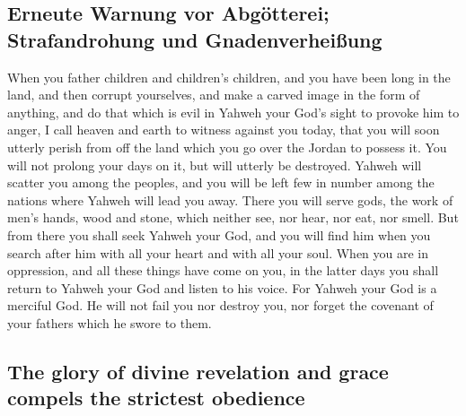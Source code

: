 \hypertarget{erneute-warnung-vor-abguxf6tterei-strafandrohung-und-gnadenverheiuxdfung}{%
\subsection{Erneute Warnung vor Abgötterei; Strafandrohung und
Gnadenverheißung}\label{erneute-warnung-vor-abguxf6tterei-strafandrohung-und-gnadenverheiuxdfung}}

 When you father children and children's children, and
you have been long in the land, and then corrupt yourselves, and make a
carved image in the form of anything, and do that which is evil in
Yahweh your God's sight to provoke him to anger,  I call
heaven and earth to witness against you today, that you will soon
utterly perish from off the land which you go over the Jordan to possess
it. You will not prolong your days on it, but will utterly be destroyed.
 Yahweh will scatter you among the peoples, and you will
be left few in number among the nations where Yahweh will lead you away.
 There you will serve gods, the work of men's hands, wood
and stone, which neither see, nor hear, nor eat, nor smell.
 But from there you shall seek Yahweh your God, and you
will find him when you search after him with all your heart and with all
your soul.  When you are in oppression, and all these
things have come on you, in the latter days you shall return to Yahweh
your God and listen to his voice.  For Yahweh your God is
a merciful God. He will not fail you nor destroy you, nor forget the
covenant of your fathers which he swore to them.

\hypertarget{the-glory-of-divine-revelation-and-grace-compels-the-strictest-obedience}{%
\subsection{The glory of divine revelation and grace compels the
strictest
obedience}\label{the-glory-of-divine-revelation-and-grace-compels-the-strictest-obedience}}

